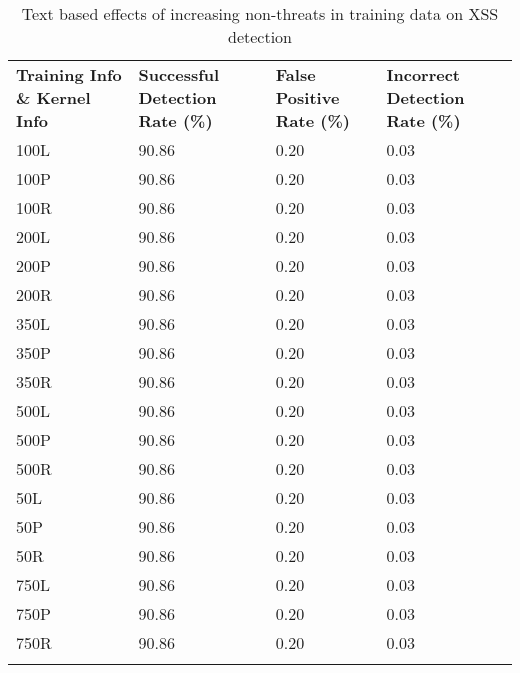 \begin{appendices}
\begin{longtable}{|p{1.5in}|p{1in}|p{1in}|p{1in}|}
	\hline
	\textbf{Training Info \& Kernel Info} & \textbf{Successful Detection Rate (\%)} & \textbf{False Positive Rate (\%)} & \textbf{Incorrect Detection Rate (\%)}  \\
	\hhline{|=|=|=|=|}
 	100L & 90.86 & 0.20 & 0.03 \\ \hline
 	100P & 90.86 & 0.20 & 0.03 \\ \hline
 	100R & 90.86 & 0.20 & 0.03 \\ \hline
 	200L & 90.86 & 0.20 & 0.03 \\ \hline
 	200P & 90.86 & 0.20 & 0.03 \\ \hline
 	200R & 90.86 & 0.20 & 0.03 \\ \hline
 	350L & 90.86 & 0.20 & 0.03 \\ \hline
 	350P & 90.86 & 0.20 & 0.03 \\ \hline
 	350R & 90.86 & 0.20 & 0.03 \\ \hline
 	500L & 90.86 & 0.20 & 0.03 \\ \hline
 	500P & 90.86 & 0.20 & 0.03 \\ \hline
 	500R & 90.86 & 0.20 & 0.03 \\ \hline
  	50L & 90.86 & 0.20 & 0.03 \\ \hline
  	50P & 90.86 & 0.20 & 0.03 \\ \hline
  	50R & 90.86 & 0.20 & 0.03 \\ \hline
 	750L & 90.86 & 0.20 & 0.03 \\ \hline
 	750P & 90.86 & 0.20 & 0.03 \\ \hline
 	750R & 90.86 & 0.20 & 0.03 \\ \hline
 	\caption[]{Text based effects of increasing non-threats in training data on XSS detection}
	\label{app:xssNonThreatText}
\end{longtable}
	

\end{appendices}
